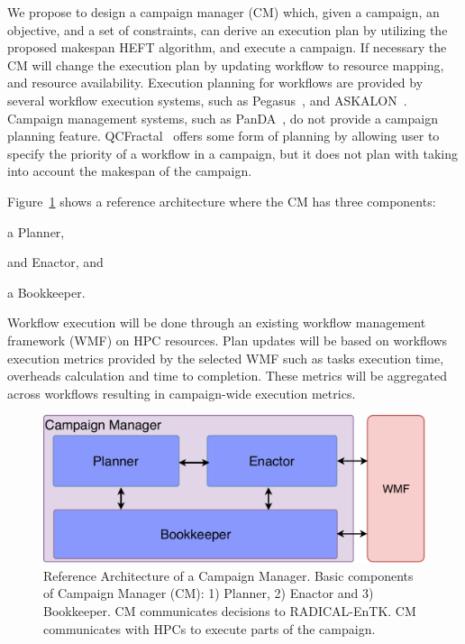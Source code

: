 We propose to design a campaign manager (CM) which, given a campaign, an objective, and a set of constraints, can derive an execution plan by utilizing the proposed makespan HEFT algorithm, and execute a campaign.
If necessary the CM will change the execution plan by updating workflow to resource mapping, and resource availability.
Execution planning for workflows are provided by several workflow execution systems, such as Pegasus~\cite{deelman2015pegasus}, and ASKALON~\cite{fahringer2005askalon}.
Campaign management systems, such as PanDA~\cite{maeno2008panda}, do not provide a campaign planning feature.
QCFractal~\cite{qcfractal} offers some form of planning by allowing user to specify the priority of a workflow in a campaign, but it does not plan with taking into account the makespan of the campaign.

Figure~\ref{fig:refarch} shows a reference architecture where the CM has three components:
\begin{inparaenum}[(1)]
\item a Planner,
\item and Enactor, and
\item a Bookkeeper. 
\end{inparaenum}
Workflow execution will be done through an existing workflow management framework (WMF) on HPC resources.
Plan updates will be based on workflows execution metrics provided by the selected WMF such as tasks execution time, overheads calculation and time to completion.
These metrics will be aggregated across workflows resulting in campaign-wide execution metrics.

\begin{figure}[t]
    \centering
    \includegraphics[width=.95\textwidth]{figures/CEM_design.pdf}
    \caption{Reference Architecture of a Campaign Manager. Basic 
    components of Campaign Manager (CM): 1) Planner, 2) Enactor and 3) Bookkeeper. 
    CM communicates decisions to RADICAL-EnTK. CM communicates with HPCs to 
    execute parts of the campaign.}\label{fig:refarch}
\end{figure}

